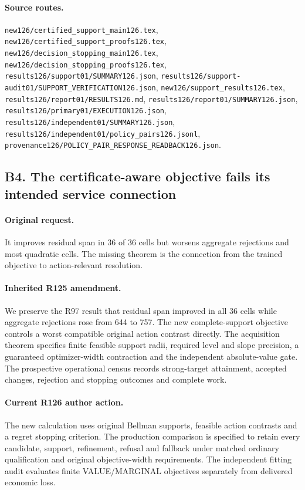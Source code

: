 \paragraph{Source routes.} \nolinkurl{new126/certified_support_main126.tex}, \nolinkurl{new126/certified_support_proofs126.tex}, \nolinkurl{new126/decision_stopping_main126.tex}, \nolinkurl{new126/decision_stopping_proofs126.tex}, \nolinkurl{results126/support01/SUMMARY126.json}, \nolinkurl{results126/support-audit01/SUPPORT_VERIFICATION126.json}, \nolinkurl{new126/support_results126.tex}, \nolinkurl{results126/report01/RESULTS126.md}, \nolinkurl{results126/report01/SUMMARY126.json}, \nolinkurl{results126/primary01/EXECUTION126.json}, \nolinkurl{results126/independent01/SUMMARY126.json}, \nolinkurl{results126/independent01/policy_pairs126.jsonl}, \nolinkurl{provenance126/POLICY_PAIR_RESPONSE_READBACK126.json}.

\subsection*{B4. The certificate-aware objective fails its intended service connection}
\paragraph{Original request.} It improves residual span in 36 of 36 cells but worsens aggregate rejections and most quadratic cells. The missing theorem is the connection from the trained objective to action-relevant resolution.

\paragraph{Inherited R125 amendment.} We preserve the R97 result that residual span improved in all 36 cells while aggregate rejections rose from 644 to 757. The new complete-support objective controls a worst compatible original action contrast directly. The acquisition theorem specifies finite feasible support radii, required level and slope precision, a guaranteed optimizer-width contraction and the independent absolute-value gate. The prospective operational census records strong-target attainment, accepted changes, rejection and stopping outcomes and complete work.

\paragraph{Current R126 author action.} The new calculation uses original Bellman supports, feasible action contrasts and a regret stopping criterion. The production comparison is specified to retain every candidate, support, refinement, refusal and fallback under matched ordinary qualification and original objective-width requirements. The independent fitting audit evaluates finite VALUE/MARGINAL objectives separately from delivered economic loss.


